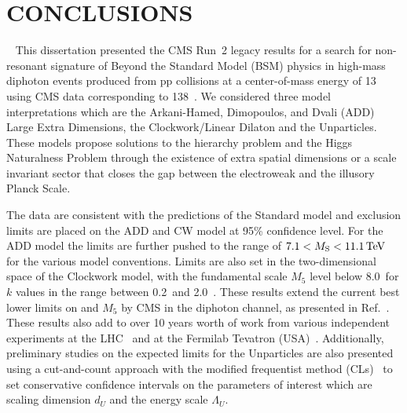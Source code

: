 \chapter{CONCLUSIONS}~\label{ch:conclusion}
\RaggedRight \parindent=25pt
This dissertation presented the CMS Run~2 legacy results for a search for non-resonant signature of Beyond the Standard Model (BSM) physics in high-mass diphoton events produced from pp collisions at a center-of-mass energy of 13 \TeV using CMS data corresponding to 138~\fbinv. We considered three model interpretations which are the Arkani-Hamed, Dimopoulos, and Dvali (ADD) Large Extra Dimensions, the Clockwork/Linear Dilaton and the Unparticles. These models propose solutions to the hierarchy problem and the Higgs Naturalness Problem through the existence of extra spatial dimensions or a scale invariant sector that closes the gap between the electroweak and the illusory Planck Scale.

The data are consistent with the predictions of the Standard model and exclusion limits are placed on the ADD and CW model at 95\% confidence level. For the ADD model the limits are further pushed to the range of $7.1 < M_{\rm S} < 11.1\,\text{Te\hspace{-.08em}V}$ for the various model conventions. Limits are also set in the two-dimensional space of the Clockwork model, with the fundamental scale $M_5$ level below 8.0~\TeV for $k$ values in the range between 0.2~\GeV and 2.0~\TeV. These results extend the current best lower limits on \Ms and $M_5$ by CMS in the diphoton channel, as presented in Ref.~\cite{cmsdiphoton2016}. These results also add to over 10 years worth of work from various independent experiments at the LHC~\cite{Sirunyan:2018wnk,Aad:2021,Aaboud:2017yyg,Khachatryan:2016yec,Aaboud:2016tru,Khachatryan:2016hje} and at the Fermilab Tevatron (USA)~\cite{Aaltonen:2011xp,CDF:2002hrr,CDF:2010muc,CDF:2011weq,Abazov:2010xh,D0:2000cve,D0:2008hxb,D0:2005srl}. Additionally, preliminary studies on the expected limits for the Unparticles are also presented using a cut-and-count approach with the modified frequentist method (CLs)~\cite{Cowan:2010js} to set conservative confidence intervals on the parameters of interest which are scaling dimension $d_U$ and the energy scale $\Lambda_{U}$. 



